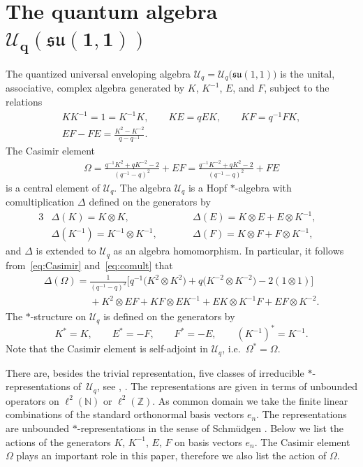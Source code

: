 \documentclass[pdftex]{sigma}
\numberwithin{equation}{section}
\numberwithin{theorem}{section}
\numberwithin{proposition}{section}
\numberwithin{lemma}{section}
\numberwithin{corollary}{section}
\numberwithin{definition}{section}
\numberwithin{example}{section}
\numberwithin{remark}{section}
\numberwithin{note}{section}
\newcommand{\N}{\mathbb N}
\newcommand{\Z}{\mathbb Z}
\newcommand{\su}{\mathfrak{su}}
\newcommand{\U}{\mathcal U}
\begin{document}
\section[The quantum algebra $\U_q(\su(1,1))$]{The quantum algebra $\boldsymbol{\U_q(\su(1,1))}$} \label{sec:Uq}

The quantized universal enveloping algebra $\mathcal U_q = \U_q\big(\su(1,1)\big)$ is the unital, associative, complex algebra generated by $K$, $K^{-1}$, $E$, and $F$, subject to the relations
\begin{gather}
K K^{-1} = 1 = K^{-1}K, \qquad KE = qEK, \qquad KF= q^{-1}FK, \nonumber\\
 EF-FE =\frac{K^2-K^{-2}}{q-q^{-1}}.\label{eq:commutationrel}
\end{gather}
The Casimir element
\begin{gather} \label{eq:Casimir}
\Omega = \frac{q^{-1} K^2 +qK^{-2}-2}{(q^{-1}-q)^2} + EF= \frac{q^{-1}K^{-2}+qK^2-2}{(q^{-1}-q)^2} +FE
\end{gather}
is a central element of $\U_q$. The algebra
$\U_q$ is a Hopf $*$-algebra with comultiplication $\Delta$ def\/ined on the generators by
\begin{alignat}{3}
& \Delta(K) = K \otimes K,\qquad && \Delta(E)= K \otimes E + E \otimes K^{-1},& \nonumber\\
& \Delta(K^{-1}) = K^{-1} \otimes K^{-1},\qquad && \Delta(F) = K \otimes F + F \otimes K^{-1} ,& \label{eq:comult}
\end{alignat}
and $\Delta$ is extended to $\mathcal U_q$ as an algebra homomorphism. In particular, it follows from~\eqref{eq:Casimir} and~\eqref{eq:comult} that
\begin{gather}
\Delta(\Omega) = \frac{1}{(q^{-1}-q)^{2}} \big[ q^{-1}\big( K^2 \otimes K^2 \big)+ q
\big(K^{-2} \otimes K^{-2}\big) -2 (1\otimes 1) \big] \nonumber\\
\phantom{\Delta(\Omega) =}{} + K^2 \otimes EF +KF\otimes
EK^{-1} + EK \otimes K^{-1}F + EF \otimes K^{-2}.\label{eq:De(OM)}
\end{gather}
The $*$-structure on $\U_q$ is def\/ined on the generators by
\[
K^*=K, \qquad E^*=-F, \qquad F^* = -E, \qquad (K^{-1})^* = K^{-1}.
\]
Note that the Casimir element is self-adjoint in $\U_q$, i.e.~$\Omega^*=\Omega$.

There are, besides the trivial representation, f\/ive classes of irreducible $*$-representations of~$\U_q$, see \cite[Proposition~4]{MMNNSU}, \cite[Section~6]{BK93}. The representations are given in terms of unbounded operators on $\ell^2(\N)$ or $\ell^2(\Z)$. As common domain we take the f\/inite linear combinations of the standard orthonormal basis vectors $e_n$. The representations are unbounded $*$-representations in the sense of Schm\"udgen \cite[Def\/inition~8.1.9]{Sch}. Below we list the actions of the generators $K$, $K^{-1}$, $E$, $F$ on basis vectors $e_n$. The Casimir element~$\Omega$ plays an important role in this paper, therefore we also list the action of $\Omega$.
\end{document}

